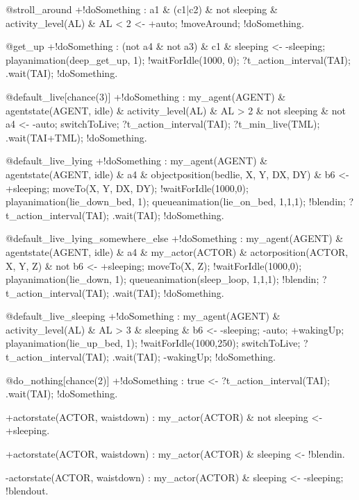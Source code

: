 \documentclass[draft,final]{vutinfth} %
\begin{document}
{@stroll\_around
+!doSomething : a1 \& (c1|c2) \& not sleeping \& activity\_level(AL) \& AL < 2
    <-  +auto;
        !moveAround;
        !doSomething.

@get\_up
+!doSomething : (not a4 \& not a3) \& c1 \& sleeping
    <-  -sleeping;
        playanimation(deep\_get\_up, 1);
        !waitForIdle(1000, 0);
        ?t\_action\_interval(TAI);
        .wait(TAI);
        !doSomething.

@default\_live[chance(3)]
+!doSomething : my\_agent(AGENT) \& agentstate(AGENT, idle) \& activity\_level(AL) \& AL > 2 \& not sleeping \& not a4
    <-  -auto;
        switchToLive;
        ?t\_action\_interval(TAI);
        ?t\_min\_live(TML);
        .wait(TAI+TML);
        !doSomething.

@default\_live\_lying
+!doSomething : my\_agent(AGENT) \& agentstate(AGENT, idle) \& a4 \& objectposition(bedlie, X, Y, DX, DY) \& b6
    <-  +sleeping;
        moveTo(X, Y, DX, DY);
        !waitForIdle(1000,0);
        playanimation(lie\_down\_bed, 1);
        queueanimation(lie\_on\_bed, 1,1,1);
        !blendin;
        ?t\_action\_interval(TAI);
        .wait(TAI);
        !doSomething.

@default\_live\_lying\_somewhere\_else
+!doSomething : my\_agent(AGENT) \& agentstate(AGENT, idle) \& a4 \& my\_actor(ACTOR) \& actorposition(ACTOR, X, Y, Z) \& not b6
    <-  +sleeping;
        moveTo(X, Z);
        !waitForIdle(1000,0);
        playanimation(lie\_down, 1);
        queueanimation(sleep\_loop, 1,1,1);
        !blendin;
        ?t\_action\_interval(TAI);
        .wait(TAI);
        !doSomething.

@default\_live\_sleeping
+!doSomething : my\_agent(AGENT) \& activity\_level(AL) \& AL > 3 \& sleeping \& b6
    <-  -sleeping;
        -auto;
        +wakingUp;
        playanimation(lie\_up\_bed, 1);
        !waitForIdle(1000,250);
        switchToLive;
        ?t\_action\_interval(TAI);
        .wait(TAI);
        -wakingUp;
        !doSomething.

@do\_nothing[chance(2)]
+!doSomething : true
    <-  ?t\_action\_interval(TAI);
        .wait(TAI);
        !doSomething.

+actorstate(ACTOR, waistdown) : my\_actor(ACTOR) \& not sleeping
    <-  +sleeping.

+actorstate(ACTOR, waistdown) : my\_actor(ACTOR) \& sleeping
    <-  !blendin.

-actorstate(ACTOR, waistdown) : my\_actor(ACTOR) \& sleeping
    <-  -sleeping;
        !blendout.

}
\end{document}
